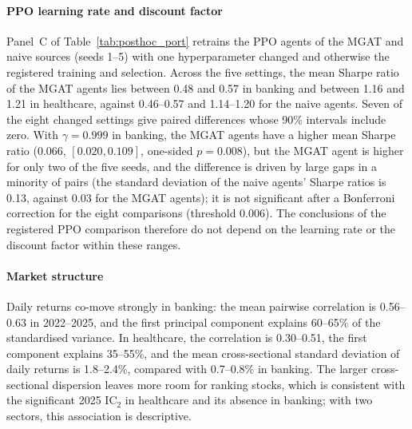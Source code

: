 {\paragraph{PPO learning rate and discount factor}
Panel~C of Table~\ref{tab:posthoc_port} retrains the PPO agents of the MGAT and naive sources (seeds 1--5) with one hyperparameter changed and otherwise the registered training and selection. Across the five settings, the mean Sharpe ratio of the MGAT agents lies between 0.48 and 0.57 in banking and between 1.16 and 1.21 in healthcare, against 0.46--0.57 and 1.14--1.20 for the naive agents. Seven of the eight changed settings give paired differences whose 90\% intervals include zero. With $\gamma=0.999$ in banking, the MGAT agents have a higher mean Sharpe ratio (0.066, $[0.020, 0.109]$, one-sided $p=0.008$), but the MGAT agent is higher for only two of the five seeds, and the difference is driven by large gaps in a minority of pairs (the standard deviation of the naive agents' Sharpe ratios is 0.13, against 0.03 for the MGAT agents); it is not significant after a Bonferroni correction for the eight comparisons (threshold 0.006). The conclusions of the registered PPO comparison therefore do not depend on the learning rate or the discount factor within these ranges.

\paragraph{Market structure}
Daily returns co-move strongly in banking: the mean pairwise correlation is 0.56--0.63 in 2022--2025, and the first principal component explains 60--65\% of the standardised variance. In healthcare, the correlation is 0.30--0.51, the first component explains 35--55\%, and the mean cross-sectional standard deviation of daily returns is 1.8--2.4\%, compared with 0.7--0.8\% in banking. The larger cross-sectional dispersion leaves more room for ranking stocks, which is consistent with the significant 2025 IC$_2$ in healthcare and its absence in banking; with two sectors, this association is descriptive.\par}




